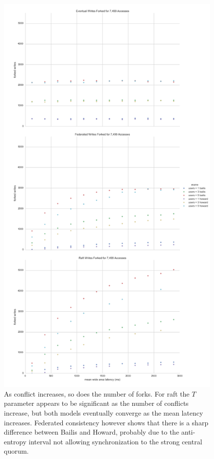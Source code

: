 \documentclass[10pt,letterpaper]{article}
\begin{document}
\begin{figure}[!h]
    \centering
        \includegraphics[height=0.9\textheight]{figures/forked_writes.png}
        \caption{\textsf{As conflict increases, so does the number of forks. For raft the $T$ parameter appears to be significant as the number of conflicts increase, but both models eventually converge as the mean latency increases. Federated consistency however shows that there is a sharp difference between Bailis and Howard, probably due to the anti-entropy interval not allowing synchronization to the strong central quorum.}}
        \label{fig:forked_writes}
\end{figure}
\end{document}
